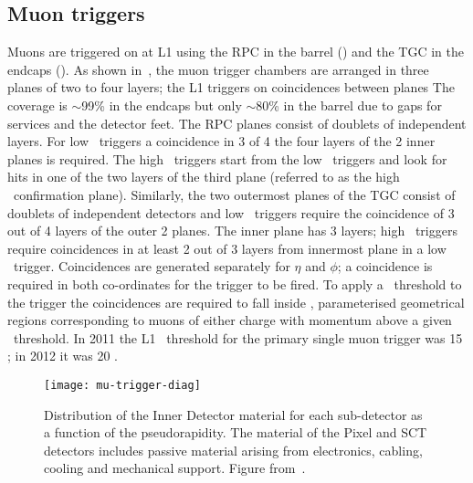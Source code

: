 \subsection{Muon triggers}
\label{sec:reco-mu-triggers}

Muons are triggered on at L1 using the RPC in the barrel () and
the TGC in the endcaps (). As shown in~, the
muon trigger chambers are arranged in three planes of two to four layers; the L1
triggers on coincidences between planes
The coverage is $\sim$99\% in the endcaps but only $\sim$80\% in the barrel due to
gaps for services and the detector feet.
The RPC planes consist of
doublets of independent layers. For low \pt\ triggers a coincidence in 3 of 4
the four layers of the 2 inner planes is required. The high \pt\ triggers start
from the low \pt\ triggers and look for hits in one of the two layers of the
third plane (referred to as the high \pt\ confirmation plane). Similarly, the two outermost
planes of the TGC consist of doublets of independent detectors and low \pt\
triggers require the coincidence of 3 out of 4 layers of the outer 2 planes. The
inner plane has 3 layers; high \pt\ triggers require coincidences in at least 2
out of 3 layers from innermost plane in a low \pt\ trigger. Coincidences are generated separately for
$\eta$ and $\phi$; a coincidence is required in both co-ordinates for the
trigger to be fired. To apply a \pt\ threshold to the trigger the coincidences
are required to fall inside \intro{roads}, parameterised geometrical regions
corresponding to muons of either charge with momentum above a given \pt\
threshold. In 2011 the L1 \pt\ threshold for the primary single muon trigger was
15 \GeV; in 2012 it was 20 \GeV.

\begin{figure}[h]
\centering
            \texttt{[image: mu-trigger-diag]}
\caption{
Distribution of the Inner Detector material for each sub-detector as a
function of the pseudorapidity. The material of the Pixel and SCT detectors
includes passive material arising from electronics, cabling, cooling and
mechanical support. Figure from~\cite{TriggerPerf2010}.}
\label{fig:mu-trigger-diag}
\end{figure}


